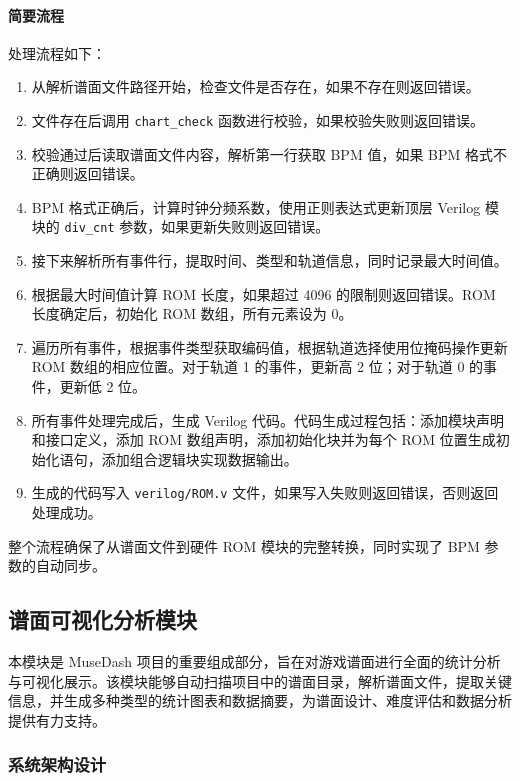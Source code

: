 \documentclass[12pt, a4paper]{article}
\begin{document}
\paragraph{简要流程}
处理流程如下：
\begin{enumerate}
    \item 从解析谱面文件路径开始，检查文件是否存在，如果不存在则返回错误。
    \item 文件存在后调用 \texttt{chart\_check} 函数进行校验，如果校验失败则返回错误。
    \item 校验通过后读取谱面文件内容，解析第一行获取 BPM 值，如果 BPM 格式不正确则返回错误。
    \item BPM 格式正确后，计算时钟分频系数，使用正则表达式更新顶层 Verilog 模块的 \texttt{div\_cnt} 参数，如果更新失败则返回错误。
    \item 接下来解析所有事件行，提取时间、类型和轨道信息，同时记录最大时间值。
    \item 根据最大时间值计算 ROM 长度，如果超过 4096 的限制则返回错误。ROM 长度确定后，初始化 ROM 数组，所有元素设为 0。
    \item 遍历所有事件，根据事件类型获取编码值，根据轨道选择使用位掩码操作更新 ROM 数组的相应位置。对于轨道 1 的事件，更新高 2 位；对于轨道 0 的事件，更新低 2 位。
    \item 所有事件处理完成后，生成 Verilog 代码。代码生成过程包括：添加模块声明和接口定义，添加 ROM 数组声明，添加初始化块并为每个 ROM 位置生成初始化语句，添加组合逻辑块实现数据输出。
    \item 生成的代码写入 \texttt{verilog/ROM.v} 文件，如果写入失败则返回错误，否则返回处理成功。
\end{enumerate}

整个流程确保了从谱面文件到硬件 ROM 模块的完整转换，同时实现了 BPM 参数的自动同步。

\subsection{谱面可视化分析模块}
\label{sec:chart_analysis}

本模块是 MuseDash 项目的重要组成部分，旨在对游戏谱面进行全面的统计分析与可视化展示。该模块能够自动扫描项目中的谱面目录，解析谱面文件，提取关键信息，并生成多种类型的统计图表和数据摘要，为谱面设计、难度评估和数据分析提供有力支持。

\subsubsection{系统架构设计}
\end{document}
